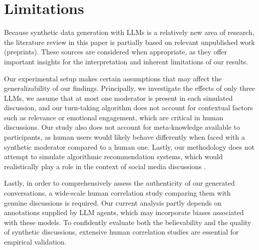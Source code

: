 %
\section{Limitations} 
\label{sec:limitations}

Because synthetic data generation with \acp{LLM} is a relatively new area of research, the literature review in this paper is partially based on relevant unpublished work (preprints). These sources are considered when appropriate, as they offer important insights for the interpretation and inherent limitations of our results.

Our experimental setup makes certain assumptions that may affect the generalizability of our findings. Principally, we investigate the effects of only three \acp{LLM}, we assume that at most one moderator is present in each simulated discussion, and our turn-taking algorithm does not account for contextual factors such as relevance or emotional engagement, which are critical in human discussions. Our study also does not account for meta-knowledge available to participants, as human users would likely behave differently when faced with a synthetic moderator compared to a human one. Lastly, our methodology does not attempt to simulate algorithmic recommendation systems, which would realistically play a role in the context of social media discussions \cite{y_social}.

Lastly, in order to comprehensively assess the authenticity of our generated conversations, a wide-scale human correlation study comparing them with genuine discussions is required. Our current analysis partly depends on annotations supplied by \ac{LLM} agents, which may incorporate biases associated with these models. To confidently evaluate both the believability and the quality of synthetic discussions, extensive human correlation studies are essential for empirical validation.